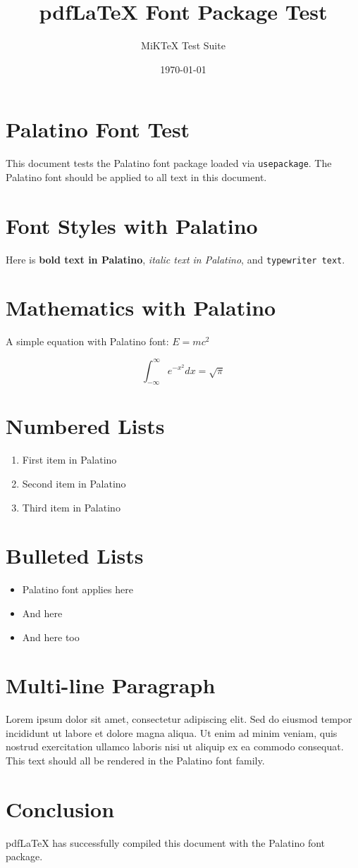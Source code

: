 \documentclass{article}
\title{pdfLaTeX Font Package Test}
\author{MiKTeX Test Suite}
\date{\today}
\begin{document}
\maketitle

\section{Palatino Font Test}
This document tests the Palatino font package loaded via \texttt{usepackage}.
The Palatino font should be applied to all text in this document.

\section{Font Styles with Palatino}
Here is \textbf{bold text in Palatino}, \textit{italic text in Palatino}, and \texttt{typewriter text}.

\section{Mathematics with Palatino}
A simple equation with Palatino font: $E = mc^2$

\[
\int_{-\infty}^{\infty} e^{-x^2} dx = \sqrt{\pi}
\]

\section{Numbered Lists}
\begin{enumerate}
  \item First item in Palatino
  \item Second item in Palatino
  \item Third item in Palatino
\end{enumerate}

\section{Bulleted Lists}
\begin{itemize}
  \item Palatino font applies here
  \item And here
  \item And here too
\end{itemize}

\section{Multi-line Paragraph}
Lorem ipsum dolor sit amet, consectetur adipiscing elit. Sed do eiusmod tempor incididunt ut labore et dolore magna aliqua. Ut enim ad minim veniam, quis nostrud exercitation ullamco laboris nisi ut aliquip ex ea commodo consequat. This text should all be rendered in the Palatino font family.

\section{Conclusion}
pdfLaTeX has successfully compiled this document with the Palatino font package.
\end{document}
